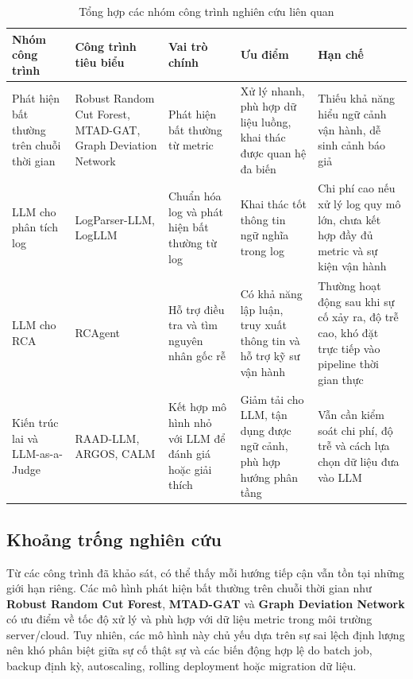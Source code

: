 \begin{table}[h!]
    \centering
    \caption{Tổng hợp các nhóm công trình nghiên cứu liên quan}
    \label{tab:related-work-summary}
    \renewcommand{\arraystretch}{1.35}
    \setlength{\tabcolsep}{4pt}
    \small
    \begin{tabularx}{\textwidth}{|
        >{\raggedright\arraybackslash}p{2.7cm}|
        >{\raggedright\arraybackslash}p{3.0cm}|
        >{\raggedright\arraybackslash}p{2.8cm}|
        >{\raggedright\arraybackslash}X|
        >{\raggedright\arraybackslash}X|
    }
        \hline
        \textbf{Nhóm công trình} 
        & \textbf{Công trình tiêu biểu} 
        & \textbf{Vai trò chính} 
        & \textbf{Ưu điểm} 
        & \textbf{Hạn chế} \\
        \hline

        Phát hiện bất thường trên chuỗi thời gian
        & Robust Random Cut Forest, MTAD-GAT, Graph Deviation Network
        & Phát hiện bất thường từ metric
        & Xử lý nhanh, phù hợp dữ liệu luồng, khai thác được quan hệ đa biến
        & Thiếu khả năng hiểu ngữ cảnh vận hành, dễ sinh cảnh báo giả \\
        \hline

        LLM cho phân tích log
        & LogParser-LLM, LogLLM
        & Chuẩn hóa log và phát hiện bất thường từ log
        & Khai thác tốt thông tin ngữ nghĩa trong log
        & Chi phí cao nếu xử lý log quy mô lớn, chưa kết hợp đầy đủ metric và sự kiện vận hành \\
        \hline

        LLM cho RCA
        & RCAgent
        & Hỗ trợ điều tra và tìm nguyên nhân gốc rễ
        & Có khả năng lập luận, truy xuất thông tin và hỗ trợ kỹ sư vận hành
        & Thường hoạt động sau khi sự cố xảy ra, độ trễ cao, khó đặt trực tiếp vào pipeline thời gian thực \\
        \hline

        Kiến trúc lai và LLM-as-a-Judge
        & RAAD-LLM, ARGOS, CALM
        & Kết hợp mô hình nhỏ với LLM để đánh giá hoặc giải thích
        & Giảm tải cho LLM, tận dụng được ngữ cảnh, phù hợp hướng phân tầng
        & Vẫn cần kiểm soát chi phí, độ trễ và cách lựa chọn dữ liệu đưa vào LLM \\
        \hline
    \end{tabularx}
\end{table}
\subsection*{Khoảng trống nghiên cứu}
Từ các công trình đã khảo sát, có thể thấy mỗi hướng tiếp cận vẫn tồn tại những giới hạn riêng. Các mô hình phát hiện bất thường trên chuỗi thời gian như \textbf{Robust Random Cut Forest},\textbf{ MTAD-GAT} và \textbf{Graph Deviation Network} có ưu điểm về tốc độ xử lý và phù hợp với dữ liệu metric trong môi trường server/cloud. Tuy nhiên, các mô hình này chủ yếu dựa trên sự sai lệch định lượng nên khó phân biệt giữa sự cố thật sự và các biến động hợp lệ do batch job, backup định kỳ, autoscaling, rolling deployment hoặc migration dữ liệu.

